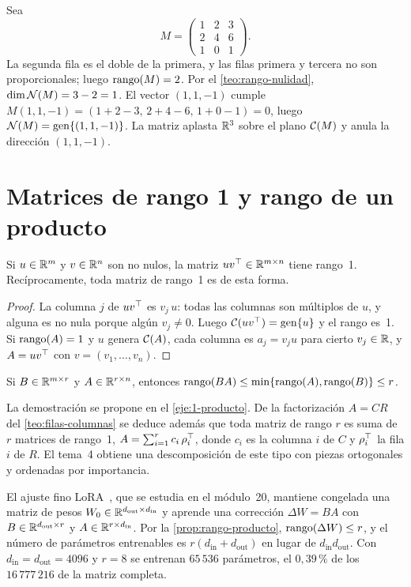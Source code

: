 \begin{ejemplo}\label{ej:M}
Sea
\[
M=\begin{pmatrix}1&2&3\\2&4&6\\1&0&1\end{pmatrix}.
\]
La segunda fila es el doble de la primera, y las filas primera y tercera no son proporcionales; luego $\operatorname{rango}(M)=2$. Por el \cref{teo:rango-nulidad}, $\dim\mathcal{N}(M)=3-2=1$. El vector $(1,1,-1)$ cumple $M(1,1,-1)=(1+2-3,\,2+4-6,\,1+0-1)=0$, luego $\mathcal{N}(M)=\operatorname{gen}\{(1,1,-1)\}$. La matriz aplasta $\mathbb{R}^{3}$ sobre el plano $\mathcal{C}(M)$ y anula la dirección $(1,1,-1)$.
\end{ejemplo}

\section{Matrices de rango 1 y rango de un producto}

\begin{proposicion}\label{prop:rango1}
Si $u\in\mathbb{R}^{m}$ y $v\in\mathbb{R}^{n}$ son no nulos, la matriz $uv^{\top}\in\mathbb{R}^{m\times n}$ tiene rango~1. Recíprocamente, toda matriz de rango~1 es de esta forma.
\end{proposicion}

\begin{proof}
La columna $j$ de $uv^{\top}$ es $v_j\,u$: todas las columnas son múltiplos de $u$, y alguna es no nula porque algún $v_j\ne 0$. Luego $\mathcal{C}(uv^{\top})=\operatorname{gen}\{u\}$ y el rango es~1. Si $\operatorname{rango}(A)=1$ y $u$ genera $\mathcal{C}(A)$, cada columna es $a_j=v_ju$ para cierto $v_j\in\mathbb{R}$, y $A=uv^{\top}$ con $v=(v_1,\dots,v_n)$.
\end{proof}

\begin{proposicion}\label{prop:rango-producto}
Si $B\in\mathbb{R}^{m\times r}$ y $A\in\mathbb{R}^{r\times n}$, entonces $\operatorname{rango}(BA)\le\min\{\operatorname{rango}(A),\operatorname{rango}(B)\}\le r$.
\end{proposicion}

La demostración se propone en el \cref{eje:1-producto}. De la factorización $A=CR$ del \cref{teo:filas-columnas} se deduce además que toda matriz de rango $r$ es suma de $r$ matrices de rango~1, $A=\sum_{i=1}^{r}c_i\,\rho_i^{\top}$, donde $c_i$ es la columna $i$ de $C$ y $\rho_i^{\top}$ la fila $i$ de $R$. El tema~4 obtiene una descomposición de este tipo con piezas ortogonales y ordenadas por importancia.

\begin{observacion}\label{obs:lora-rango}
El ajuste fino LoRA~\cite{hu-lora}, que se estudia en el módulo~20, mantiene congelada una matriz de pesos $W_0\in\mathbb{R}^{d_{\text{out}}\times d_{\text{in}}}$ y aprende una corrección $\Delta W=BA$ con $B\in\mathbb{R}^{d_{\text{out}}\times r}$ y $A\in\mathbb{R}^{r\times d_{\text{in}}}$. Por la \cref{prop:rango-producto}, $\operatorname{rango}(\Delta W)\le r$, y el número de parámetros entrenables es $r(d_{\text{in}}+d_{\text{out}})$ en lugar de $d_{\text{in}}d_{\text{out}}$. Con $d_{\text{in}}=d_{\text{out}}=4096$ y $r=8$ se entrenan $65\,536$ parámetros, el $0{,}39\,\%$ de los $16\,777\,216$ de la matriz completa.
\end{observacion}


